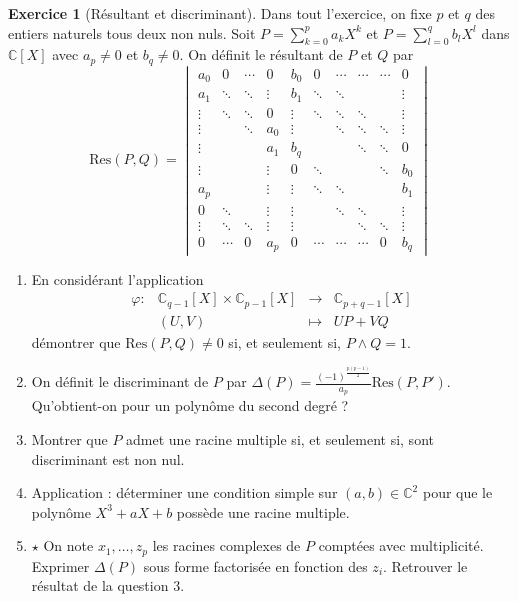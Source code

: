 \documentclass[french]{book}
\newcommand{\C}{\mathbb{C}}
\theoremstyle{definition}
\newtheorem{ex}{Exercice}[chapter]
\theoremstyle{theorem}
\theoremstyle{remark}
\begin{document}
\begin{ex}[Résultant et discriminant]
	Dans tout l'exercice, on fixe $p$ et $q$ des entiers naturels tous deux non nuls. Soit $P=\displaystyle\sum_{k=0}^{p}a_kX^k$ et  $P=\displaystyle\sum_{l=0}^{q}b_lX^l$ dans $\C[X]$ avec $a_p\ne0$ et $b_q\ne0$. On définit le résultant de $P$ et $Q$ par $$\text{Res}(P,Q)=\begin{vmatrix}
	a_0&0&\cdots&0&b_0&0&\cdots&\cdots&\cdots&0 \\
	a_1&\ddots&\ddots&\vdots&b_1&\ddots&\ddots&&&\vdots\\
	\vdots&\ddots&\ddots&0&\vdots&\ddots&\ddots&\ddots&&\vdots\\
	\vdots&&\ddots&a_0&\vdots&&\ddots&\ddots&\ddots&\vdots\\
	\vdots&&&a_1&b_q&&&\ddots&\ddots&0\\
	\vdots&&&\vdots&0&\ddots&&&\ddots&b_0\\
	a_p&&&\vdots&\vdots&\ddots&\ddots&&&b_1\\
	0&\ddots&&\vdots&\vdots&&\ddots&\ddots&&\vdots\\
	\vdots&\ddots&\ddots&\vdots&\vdots&&&\ddots&\ddots&\vdots\\
	0&\cdots&0&a_p&0&\cdots&\cdots&\cdots&0&b_q
	\end{vmatrix}$$
	\begin{enumerate}
		\item En considérant l'application $$\begin{array}{lrcl}
			\varphi:&\C_{q-1}[X]\times\C_{p-1}[X]&\longrightarrow&\C_{p+q-1}[X]\\
			&(U,V)&\longmapsto &UP+VQ
		\end{array}$$ démontrer que $\text{Res}(P,Q)\ne 0$ si, et seulement si, $P\wedge Q=1$.
		\item On définit le discriminant de $P$ par $\Delta(P)=\displaystyle\frac{(-1)^{\frac{p(p-1)}{2}}}{a_p}\text{Res}(P,P')$. Qu'obtient-on pour un polynôme du second degré ?
		\item Montrer que $P$ admet une racine multiple si, et seulement si, sont discriminant est non nul.
		\item Application : déterminer une condition simple sur $(a,b)\in\C^2$ pour que le polynôme $X^3+aX+b$ possède une racine multiple.
		\item $\star$ On note $x_1,\ldots,z_p$ les racines complexes de $P$ comptées avec multiplicité. Exprimer $\Delta(P)$ sous forme factorisée en fonction des $z_i$. Retrouver le résultat de la question $3$.
	\end{enumerate}
\end{ex}
\end{document}
